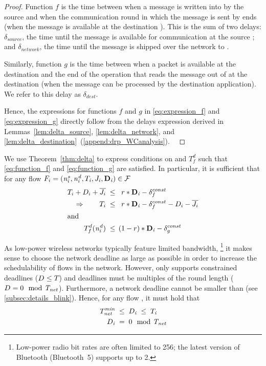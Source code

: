 \begin{proof}%
Function $f$ is the time between when a message is written into \bolt by the source \apsrc and when the communication round in which the message is sent by \blink ends (\ie when the message is available at the destination \cpdst).
This is the sum of two delays: $\delta_{source}$, the time until the message is available for communication at the source \cpsrc; and $\delta_{network}$, the time until the message is shipped over the network to \cpdst.

Similarly, function $g$ is the time between when a packet is available at the destination \cpdst and the end of the \opflush operation that reads the message out of \bolt at the destination \apdst (\ie when the message can be processed by the destination application).
We refer to this delay as $\delta_{dest}$.

Hence, the expressions for functions $f$ and $g$ in \eqref{eq:expression_f} and \eqref{eq:expression_g} directly follow from the delays expression derived in Lemmas~\ref{lem:delta_source}, \ref{lem:delta_network}, and \ref{lem:delta_destination}~(\cref{append:drp_WCanalysis}).
\
\end{proof}

We use Theorem~\ref{thm:delta} to express conditions on \ndeadlinei and $T_f^d$ such that \eqref{eq:function_f} and \eqref{eq:function_g} are satisfied.
In particular, it is sufficient that for any flow $F_{i} = (\mathit{n^s_{i}},\mathit{n^d_{i}},T_{\mathit{i}},J_{i},\mathbf{D}_{\mathit{i}}) \in \mathcal{F}$
\begin{align}
\nonumber
 T_i + D_i + \overline{J_{i}} \;
	& \leq  \;\; r * \mathbf{D}_{\mathit{i}} - \delta_f^{const} \\
\label{eq:ndeadline_constraint_latency}
\Rightarrow \qquad T_i \;
	& \leq  \;\; r * \mathbf{D}_{\mathit{i}} - \delta_f^{const} - D_i - \overline{J_{i}} \\
\intertext{and}
\label{eq:APflush_constraint_base}
T_f^d(\mathit{n^d_{i}}) \;
	& \leq \, (1-r)*\mathbf{D}_{\mathit{i}} -  \delta_g^{const}
\end{align}

As low-power wireless networks typically feature limited bandwidth,%
\footnote{Low-power radio bit rates are often limited to 256\kbps; the latest version of Bluetooth (Bluetooth~5) supports up to 2\Mbps.}
%
it makes sense to choose the network deadline \ndeadlinei as large as possible in order to increase the schedulability of flows in the network.
However, \blink only supports constrained deadlines ($D_{\mathit{}} \leq T_{\mathit{}}$) and deadlines must be multiples of the round length ($D_{\mathit{}} = 0 \mod {\mathit{T_{net}}} $).
Furthermore, a network deadline cannot be smaller than \rperiodmin (see \cref{subsec:details_blink}).
%
Hence, for any flow \flowi, it must hold that
\begin{align}
  \label{eq:ndeadline_constraint_period}
  \mathit{T_{net}^{min}} \; &\leq \; D_{\mathit{i}} \; \leq \; T_{\mathit{i}} \\
  D_{\mathit{i}} \; &= \; 0 \mod {\mathit{T_{net}}}
\end{align}

